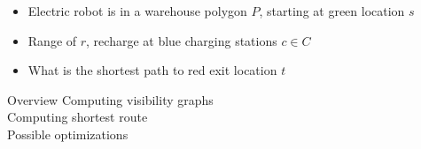 \begin{frame}
\begin{center}
\vspace{-2em}
%
%
\end{center}

\begin{itemize}
\item Electric robot is in a warehouse polygon $P$, starting at green location $s$
\item Range of $r$, recharge at blue charging stations $c \in C$
\item What is the shortest path to red exit location $t$
\end{itemize}

\end{frame}

\begin{frame}{Overview}
Computing visibility graphs
\\[2em]
Computing shortest route
\\[2em]
Possible optimizations
\end{frame}

